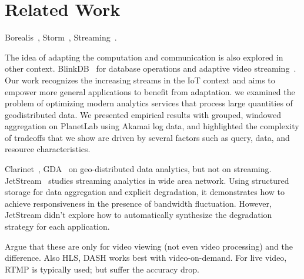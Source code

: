\section{Related Work}
\label{sec:related-work}

 Borealis~\cite{abadi2005design},
Storm~\cite{toshniwal2014storm}, Streaming~\cite{zaharia2012discretized}.

 The idea of adapting the computation and
communication is also explored in other
context. BlinkDB~\cite{agarwal2013blinkdb} for database operations and adaptive
video streaming~\cite{yin2015control}. Our work recognizes the increasing
streams in the IoT context and aims to empower more general applications to
benefit from adaptation. \cite{heintz2015towards} we examined the problem of
optimizing modern analytics services that process large quantities of
geodistributed data. We presented empirical results with grouped, windowed
aggregation on PlanetLab using Akamai log data, and highlighted the complexity
of tradeoffs that we show are driven by several factors such as query, data, and
resource characteristics.

 Clarinet~\cite{viswanathan2016clarinet}, GDA~\cite{pu2015low}
on geo-distributed data analytics, but not on
streaming. JetStream~\cite{rabkin2014aggregation} studies streaming analytics in
wide area network. Using structured storage for data aggregation and explicit
degradation, it demonstrates how to achieve responsiveness in the presence of
bandwidth fluctuation. However, JetStream didn't explore how to automatically
synthesize the degradation strategy for each application.

 Argue that these are only for video viewing (not even
video processing) and the difference. Also HLS, DASH works best with
video-on-demand. For live video, RTMP is typically used; but suffer the accuracy
drop.


